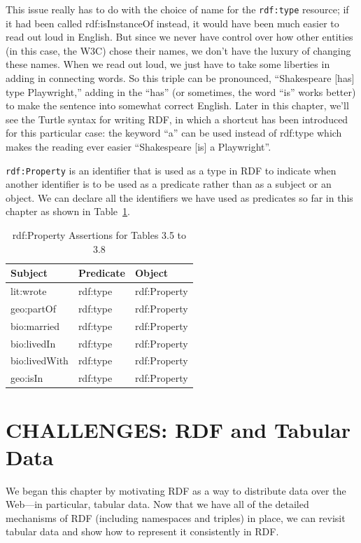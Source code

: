 This issue really has to do with the choice of name for the \texttt{rdf:type}
resource; if it had been called rdf:isInstanceOf instead, it would have
been much easier to read out loud in English. But since we never have
control over how other entities (in this case, the W3C) chose their
names, we don't have the luxury of changing these names. When we read
out loud, we just have to take some liberties in adding in connecting
words. So this triple can be pronounced, ``Shakespeare {[}has{]} type
Playwright,'' adding in the ``has'' (or sometimes, the word ``is'' works
better) to make the sentence into somewhat correct English. Later in
this chapter, we'll see the Turtle syntax for writing RDF, in which a
shortcut has been introduced for this particular case: the keyword ``a''
can be used instead of rdf:type which makes the reading ever easier
``Shakespeare {[}is{]} a Playwright''.

\texttt{rdf:Property} is an identifier that is used as a type in RDF to indicate
when another identifier is to be used as a predicate rather than as a
subject or an object. We can declare all the identifiers we have used as
predicates so far in this chapter as shown in Table~\ref{tab:ch3.11}.

\begin{table}[h]
\centering
\begin{tabular}{||l l l ||} 
 \hline
 Subject&Predicate&Object \\ [0.5ex] 
 \hline\hline
lit:wrote&rdf:type&rdf:Property\\
geo:partOf&rdf:type&rdf:Property\\
bio:married&rdf:type&rdf:Property\\
bio:livedIn&rdf:type&rdf:Property\\
bio:livedWith&rdf:type&rdf:Property\\
geo:isIn&rdf:type&rdf:Property\\
\hline
\end{tabular}
\caption{rdf:Property Assertions for Tables 3.5 to 3.8}
\label{tab:ch3.11}
\end{table}

\section{CHALLENGES: RDF and Tabular Data}

We began this chapter by motivating RDF as a way to distribute data over
the Web---in particular, tabular data. Now that we have all of the
detailed mechanisms of RDF (including namespaces and triples) in place,
we can revisit tabular data and show how to represent it consistently in
RDF.

